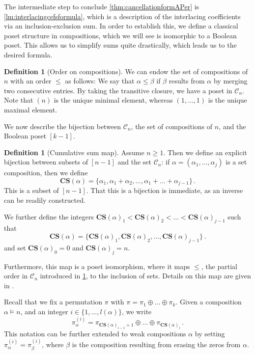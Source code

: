 \documentclass[12pt, reqno]{amsart}
\theoremstyle{definition}
\newtheorem{defin}[thm]{Definition}
\newtheorem{rem}[thm]{Remark}
\begin{document}
The intermediate step to conclude \cref{thm:cancellationformAPer} is \cref{lm:interlacingcefsformula}, which is a description of the interlacing coefficients via an inclusion-exclusion sum.
In order to establish this, we define a classical poset structure in compositions, which we will see is isomorphic to a Boolean poset.
This allows us to simplify sums quite drastically, which leads us to the desired formula.

\begin{defin}[Order on compositions]\label{defin:ordercomps}
We can endow the set of compositions of $n$ with an order $\leq $ as follows:
We say that $\alpha \leq \beta $ if $\beta $ results from $\alpha $ by merging two consecutive entries.
By taking the transitive closure, we have a poset in $\mathcal C_n$.
Note that $(n)$ is the unique minimal element, whereas $(1, \dots , 1)$ is the unique maximal element.
\end{defin}


We now describe the bijection between $\mathcal C_n$, the set of compositions of $n$, and the Boolean poset $[k-1]$.

\begin{defin}[Cumulative sum map]
Assume $n \geq 1$.
Then we define an explicit bijection between subsets of $[n-1]$ and the set $\mathcal C_n$: if $\alpha=(\alpha_1, \dots ,\alpha _j)$ is a set composition, then we define
$$ \mathbf{CS}(\alpha ) = \{\alpha_1, \alpha_1 + \alpha_2, \dots , \alpha_1 +\dots + \alpha_{j-1}\}\, . $$
This is a subset of $[n-1]$.
That this is a bijection is immediate, as an inverse can be readily constructed.

We further define the integers $ \mathbf{CS}(\alpha )_1 < \mathbf{CS}(\alpha )_2 < \dots < \mathbf{CS}(\alpha )_{j-1}$ such that 
$$ \mathbf{CS}(\alpha ) =\{ \mathbf{CS}(\alpha )_1 ,  \mathbf{CS}(\alpha )_2 ,  \dots ,  \mathbf{CS}(\alpha )_{j-1} \}\, . $$
and set $\mathbf{CS}(\alpha )_0 = 0 $ and $ \mathbf{CS}(\alpha )_j = n $.

Furthermore, this map is a poset isomorphism, where it maps $\leq $, the partial order in $\mathcal C_n$ introduced in \cref{defin:ordercomps}, to the inclusion of sets.
Details on this map are given in \cite{stanley00}.

Recall that we fix a permutation $\pi $ with $\pi = \pi_1 \oplus \dots \oplus \pi_k $.
Given a composition $\alpha \models n$, and an integer $i \in \{ 1 , \dots , l(\alpha )\}$, we write 
$$\pi^{(i)}_{\alpha } = \pi_{\mathbf{CS}(\alpha )_{i-1}+1} \oplus \dots \oplus \pi_{\mathbf{CS}(\alpha )_{i}}\, . $$
This notation can be further extended to weak compositions $\alpha $ by setting $\pi^{(i)}_{\alpha } = \pi^{(i)}_{\beta }$, where $\beta$ is the composition resulting from erasing the zeros from $\alpha $.
\end{defin}
\end{document}
